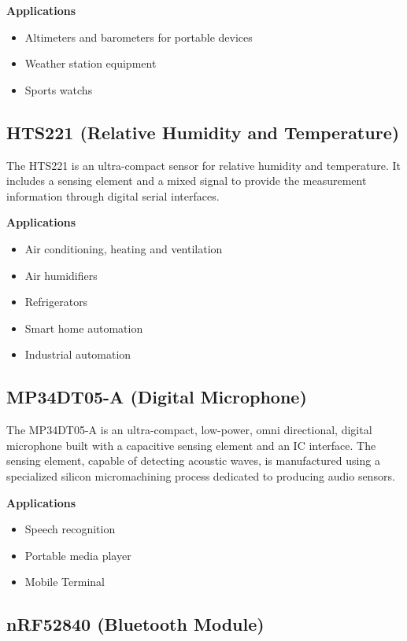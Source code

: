 \textbf{Applications}


\begin{itemize}
  \item Altimeters and barometers for portable devices 
  \item Weather station equipment
  \item Sports watchs
\end{itemize}

\subsection{HTS221 (Relative Humidity and Temperature)}
The HTS221 is an ultra-compact sensor for relative humidity and temperature. It includes a sensing element and a mixed signal to provide the measurement information through digital serial interfaces.

\textbf{Applications}

\begin{itemize}
  \item Air conditioning, heating and ventilation 
  \item Air humidifiers
  \item Refrigerators
  \item Smart home automation
  \item Industrial automation
\end{itemize}  


\subsection{MP34DT05-A (Digital Microphone)}

The MP34DT05-A is an ultra-compact, low-power, omni directional, digital microphone built with a capacitive sensing element and an IC interface. The sensing element, capable of detecting acoustic waves, is manufactured using a specialized silicon micromachining process dedicated to producing audio sensors.

\textbf{Applications}

\begin{itemize}
  \item Speech recognition 
  \item Portable media player
  \item Mobile Terminal
\end{itemize}


\subsection{nRF52840 (Bluetooth Module)}

